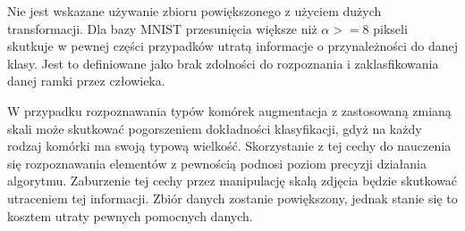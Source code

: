 Nie jest wskazane używanie zbioru powiększonego z użyciem dużych transformacji. Dla bazy MNIST przesunięcia większe niż \(\alpha >= 8\) pikseli skutkuje w pewnej części przypadków utratą informacje o przynależności do danej klasy. Jest to definiowane jako brak zdolności do rozpoznania i zaklasfikowania danej ramki przez człowieka.\cite{augmentation}

W przypadku rozpoznawania typów komórek augmentacja z zastosowaną zmianą skali może skutkować pogorszeniem dokładności klasyfikacji, gdyż na każdy rodzaj komórki ma swoją typową wielkość. Skorzystanie z tej cechy do nauczenia się rozpoznawania elementów z pewnością podnosi poziom precyzji działania algorytmu. Zaburzenie tej cechy przez manipulację skalą zdjęcia będzie skutkować utraceniem tej informacji. Zbiór danych zostanie powiększony, jednak stanie się to kosztem utraty pewnych pomocnych danych.